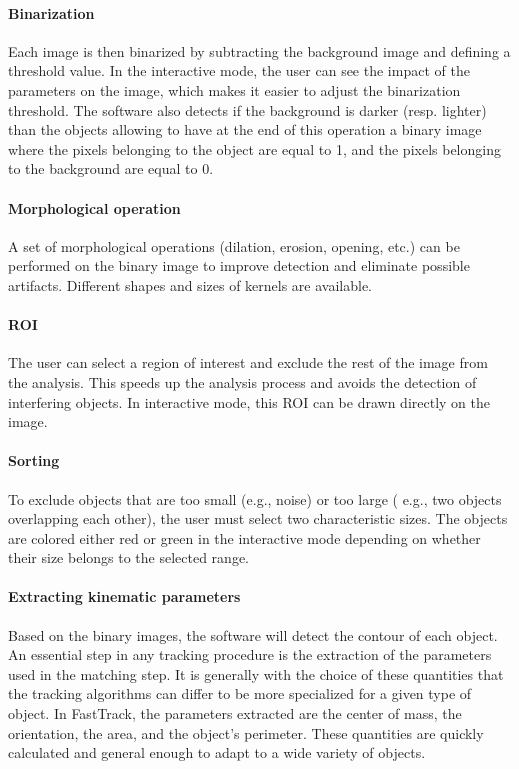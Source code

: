     \paragraph{Binarization}
    Each image is then binarized by subtracting the background image and defining a threshold value. In the interactive mode, the user can see the impact of the parameters on the image, which makes it easier to adjust the binarization threshold. The software also detects if the background is darker (resp. lighter) than the objects allowing to have at the end of this operation a binary image where the pixels belonging to the object are equal to 1, and the pixels belonging to the background are equal to 0.

    \paragraph{Morphological operation}
    A set of morphological operations (dilation, erosion, opening, etc.) can be performed on the binary image to improve detection and eliminate possible artifacts. Different shapes and sizes of kernels are available.

    \paragraph{ROI}
    The user can select a region of interest and exclude the rest of the image from the analysis. This speeds up the analysis process and avoids the detection of interfering objects. In interactive mode, this ROI can be drawn directly on the image.

    \paragraph{Sorting}
    To exclude objects that are too small (e.g., noise) or too large ( e.g., two objects overlapping each other), the user must select two characteristic sizes. The objects are colored either red or green in the interactive mode depending on whether their size belongs to the selected range.

    \paragraph{Extracting kinematic parameters}
    Based on the binary images, the software will detect the contour of each object. An essential step in any tracking procedure is the extraction of the parameters used in the matching step. It is generally with the choice of these quantities that the tracking algorithms can differ to be more specialized for a given type of object. In FastTrack, the parameters extracted are the center of mass, the orientation, the area, and the object's perimeter. These quantities are quickly calculated and general enough to adapt to a wide variety of objects.

